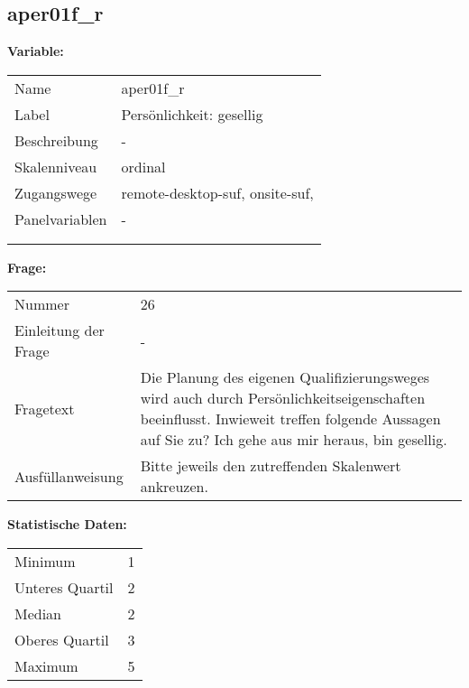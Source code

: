 	
	
	\subsection{aper01f\_r}
	\label{subSection:aper01f_r}

	\noindent\textbf{Variable:}\\
		\begin{tabular}{lL{11.3cm}}
			\label{tableVariable:aper01f_r}
			Name & aper01f\_r \\
			Label & Persönlichkeit: gesellig \\
			Beschreibung & - \\
			Skalenniveau & ordinal \\
			Zugangswege &
				remote-desktop-suf,
				onsite-suf,
 \\
			Panelvariablen & -
			 \\
			 \\
 \\
		\end{tabular}

		\vspace*{1 cm}
		\noindent\textbf{Frage:}\\
		\begin{tabular}{lL{11.3cm}}
			\label{tableQuestion:aper01f_r}
			Nummer & 26 \\
			Einleitung der Frage & - \\
			Fragetext & Die Planung des eigenen Qualifizierungsweges wird auch durch Persönlichkeitseigenschaften beeinflusst. Inwieweit treffen folgende Aussagen auf Sie zu?
Ich gehe aus mir heraus, bin gesellig. \\
			Ausfüllanweisung & Bitte jeweils den zutreffenden
Skalenwert ankreuzen. \\
		\end{tabular}


		\vspace*{1 cm}
		\noindent\textbf{Statistische Daten:}\\
			\begin{tabular}{ll}
				\label{tableStatistics:aper01f_r}
					Minimum & 1 \\
					Unteres Quartil & 2 \\
					Median & 2 \\
					Oberes Quartil & 3 \\
					Maximum & 5 \\
			\end{tabular}



